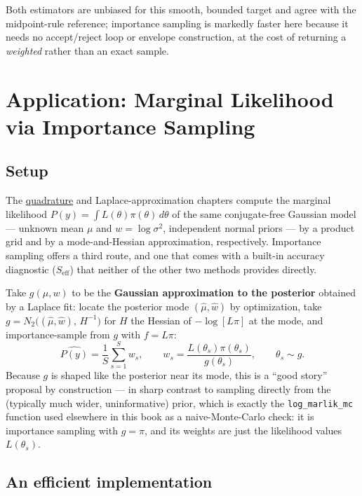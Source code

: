 \documentclass[
  letterpaper,
  DIV=11,
  numbers=noendperiod]{scrreprt}
\begin{document}
Both estimators are unbiased for this smooth, bounded target and agree
with the midpoint-rule reference; importance sampling is markedly faster
here because it needs no accept/reject loop or envelope construction, at
the cost of returning a \emph{weighted} rather than an exact sample.

\section{Application: Marginal Likelihood via Importance
Sampling}\label{application-marginal-likelihood-via-importance-sampling}

\subsection{Setup}\label{setup-1}

The \hyperref[numerical-quadrature]{quadrature} and
Laplace-approximation chapters compute the marginal likelihood
\(P(y) = \int L(\theta)\pi(\theta)\,d\theta\) of the same conjugate-free
Gaussian model --- unknown mean \(\mu\) and \(w=\log\sigma^2\),
independent normal priors --- by a product grid and by a
mode-and-Hessian approximation, respectively. Importance sampling offers
a third route, and one that comes with a built-in accuracy diagnostic
(\(S_{\text{eff}}\)) that neither of the other two methods provides
directly.

Take \(g(\mu,w)\) to be the \textbf{Gaussian approximation to the
posterior} obtained by a Laplace fit: locate the posterior mode
\((\hat\mu,\hat w)\) by optimization, take
\(g = N_2\big((\hat\mu,\hat w),\, H^{-1}\big)\) for \(H\) the Hessian of
\(-\log[L\pi]\) at the mode, and importance-sample from \(g\) with
\(f = L\pi\): \[
\widehat{P(y)} = \frac{1}{S}\sum_{s=1}^S w_s, \qquad
w_s = \frac{L(\theta_s)\pi(\theta_s)}{g(\theta_s)}, \qquad \theta_s \sim g.
\] Because \(g\) is shaped like the posterior near its mode, this is a
``good story'' proposal by construction --- in sharp contrast to
sampling directly from the (typically much wider, uninformative) prior,
which is exactly the \texttt{log\_marlik\_mc} function used elsewhere in
this book as a naive-Monte-Carlo check: it is importance sampling with
\(g = \pi\), and its weights are just the likelihood values
\(L(\theta_s)\).

\subsection{An efficient
implementation}\label{an-efficient-implementation-1}
\end{document}
